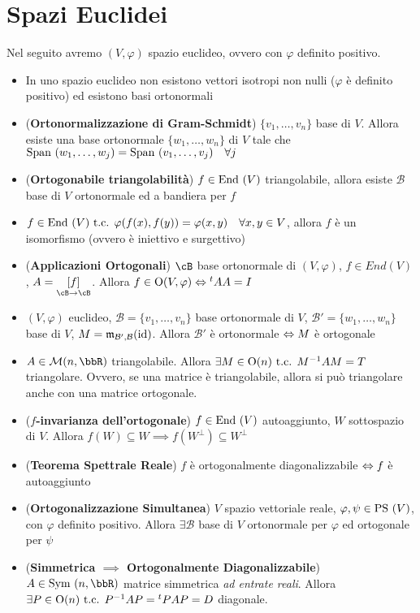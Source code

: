 \documentclass[a4paper,NoNotes,GeneralMath]{stdmdoc}
\newcommand{\mtrapp}[3]{\underset{ {{#2} \rar {#3}} }{ \left[ {#1} \right]}}
\begin{document}
	\section*{Spazi Euclidei}
	Nel seguito avremo $(V, \varphi)$ spazio euclideo, ovvero con $\varphi$ definito positivo.
	\begin{itemize}
		\item In uno spazio euclideo non esistono vettori isotropi non nulli ($\varphi$ è definito positivo) ed esistono basi ortonormali
		\item ({\bf Ortonormalizzazione di Gram-Schmidt}) $\{v_1, \ldots, v_n\}$ base di $V$. Allora esiste una base ortonormale $\{w_1, \ldots, w_n\}$ di $V$ tale che $\mbox{Span }(w_1, \ldots, w_j) = \mbox{Span }(v_1, \ldots, v_j) \quad \forall j$
		\item ({\bf Ortogonabile triangolabilità}) $f \in \mbox{End }(V)$ triangolabile, allora esiste $\mathcal{B}$ base di $V$ ortonormale ed a bandiera per $f$
		\item $f \in \mbox{End }(V) \mbox{ t.c. } \varphi(f(x), f(y)) = \varphi(x, y) \quad \forall x, y \in V$, allora $f$ è un isomorfismo (ovvero è iniettivo e surgettivo)
		\item ({\bf Applicazioni Ortogonali}) $\cB$ base ortonormale di $(V, \varphi)$, $f \in End(V)$, $A = \mtrapp{f}{\cB}{\cB}$. Allora $f \in \mbox{O}(V, \varphi) \Leftrightarrow {}^tA A = I$
		\item $(V, \varphi)$ euclideo, $\mathcal{B} = \{v_1, \ldots, v_n\}$ base ortonormale di $V$, $\mathcal{B'} = \{w_1, \ldots, w_n\}$ base di $V$, $M = \mathfrak{m}_{\mathcal{B'}, \mathcal{B}}(\mbox{id})$. Allora $\mathcal{B'}$ è ortonormale $\Leftrightarrow M$ è ortogonale
		\item $A \in \mathcal{M}(n,\bbR)$ triangolabile. Allora $\exists M \in \mbox{O}(n) \mbox{ t.c. } M^{-1}AM = T$ triangolare. Ovvero, se una matrice è triangolabile, allora si può triangolare anche con una matrice ortogonale.
		\item ({\bf $f$-invarianza dell'ortogonale}) $f\in\mbox{End }(V)$ autoaggiunto, $W$ sottospazio di $V$. Allora $f(W)\subseteq W \implies f(W^\bot)\subseteq W^\bot$
		\item ({\bf Teorema Spettrale Reale}) $f$ è ortogonalmente diagonalizzabile $\Leftrightarrow f$ è autoaggiunto
		\item ({\bf Ortogonalizzazione Simultanea}) $V$ spazio vettoriale reale, $\varphi, \psi \in \mbox{PS }(V)$, con $\varphi$ definito positivo. Allora $\exists \mathcal{B}$ base di $V$ ortonormale per $\varphi$ ed ortogonale per $\psi$
		\item ({\bf Simmetrica $\implies$ Ortogonalmente Diagonalizzabile}) $A \in \Symm(n, \bbR)$ matrice simmetrica {\it ad entrate reali}. Allora $\exists P \in \mbox{O}(n) \mbox{ t.c. } P^{-1}AP = {}^tPAP = D$ diagonale.

\end{itemize}
\end{document}
